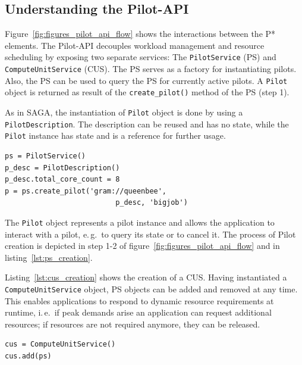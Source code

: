 \documentclass[conference,final]{IEEEtran}
\begin{document}
\subsection{Understanding the Pilot-API}

Figure~\ref{fig:figures_pilot_api_flow} shows the interactions between the
P* elements. The Pilot-API decouples workload management and resource
scheduling by exposing two separate services: The
\texttt{PilotService} (PS) and \texttt{ComputeUnitService} (CUS). The
PS serves as a factory for instantiating pilots. Also, the PS can be
used to query the PS for currently active pilots.  A
\texttt{Pilot} object is returned as result of the
\texttt{create\_pilot()} method of the PS (step 1).

As in SAGA, the instantiation of \texttt{Pilot} object is done by
using a \texttt{PilotDescription}. The description can be reused
and has no state, while the \texttt{Pilot} instance has state and
is a reference for further usage.

\lstset{
language=Python,
frame=single,
captionpos=b,
stringstyle=\ttfamily,
basicstyle=\scriptsize\ttfamily
}

\noindent\begin{minipage}{0.47 \textwidth}
\begin{lstlisting}[caption={\textbf{Pilot Creation:} Instantiation of a Pilot Service using a Pilot Description.}, label={lst:ps_creation}]
ps = PilotService()
p_desc = PilotDescription()
p_desc.total_core_count = 8
p = ps.create_pilot('gram://queenbee', 
                          p_desc, 'bigjob')
\end{lstlisting}
\end{minipage}

The \texttt{Pilot} object represents a pilot instance and allows the 
application to interact with a pilot, e.\,g.\ to query its state or to cancel 
it. The process of Pilot creation is depicted in step 1-2 of 
figure~\ref{fig:figures_pilot_api_flow} and in listing~\ref{lst:ps_creation}.

Listing~\ref{lst:cus_creation} shows the creation of a CUS.
Having instantiated a \texttt{ComputeUnitService} object, PS objects can be
added and removed at any time. This enables applications to respond to dynamic
resource requirements at runtime, i.\,e.\ if peak demands arise an application
can request additional resources; if resources are not required anymore, they
can be released.

\noindent\begin{minipage}{0.47 \textwidth}
\begin{lstlisting}[caption={\textbf{ComputeUnitService Creation:} Instantiation
of a \texttt{ComputeUnitService} using a reference to the
\texttt{PilotService}.}, label={lst:cus_creation}]
cus = ComputeUnitService()
cus.add(ps)
\end{lstlisting}
\end{minipage}
\end{document}
